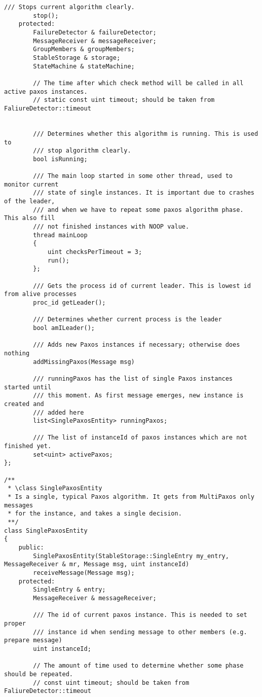 \begin{lstlisting}[frame=lines,caption=Pseudocode of Paxos algorithm]
		/// Stops current algorithm clearly.
		stop();
	protected:
		FailureDetector & failureDetector;
		MessageReceiver & messageReceiver;
		GroupMembers & groupMembers;
		StableStorage & storage;
		StateMachine & stateMachine;
		
		// The time after which check method will be called in all active paxos instances.
		// static const uint timeout; should be taken from FaliureDetector::timeout
		
		
		/// Determines whether this algorithm is running. This is used to 
		/// stop algorithm clearly.
		bool isRunning;
		
		/// The main loop started in some other thread, used to monitor current
		/// state of single instances. It is important due to crashes of the leader,
		/// and when we have to repeat some paxos algorithm phase. This also fill
		/// not finished instances with NOOP value.
		thread mainLoop
		{
			uint checksPerTimeout = 3;
			run();
		};
		
		/// Gets the process id of current leader. This is lowest id from alive processes
		proc_id getLeader();
		
		/// Determines whether current process is the leader
		bool amILeader();
		
		/// Adds new Paxos instances if necessary; otherwise does nothing
		addMissingPaxos(Message msg)
		
		/// runningPaxos has the list of single Paxos instances started until
		/// this moment. As first message emerges, new instance is created and
		/// added here
		list<SinglePaxosEntity> runningPaxos;
		
		/// The list of instanceId of paxos instances which are not finished yet.
		set<uint> activePaxos;
};

/**
 * \class SinglePaxosEntity
 * Is a single, typical Paxos algorithm. It gets from MultiPaxos only messages
 * for the instance, and takes a single decision.
 **/
class SinglePaxosEntity
{
	public:
		SinglePaxosEntity(StableStorage::SingleEntry my_entry, MessageReceiver & mr, Message msg, uint instanceId)
		receiveMessage(Message msg);
	protected:
		SingleEntry & entry;
		MessageReceiver & messageReceiver;
		
		/// The id of current paxos instance. This is needed to set proper
		/// instance id when sending message to other members (e.g. prepare message)
		uint instanceId;
	
		// The amount of time used to determine whether some phase should be repeated.
		// const uint timeout; should be taken from FaliureDetector::timeout
		

\end{lstlisting}
